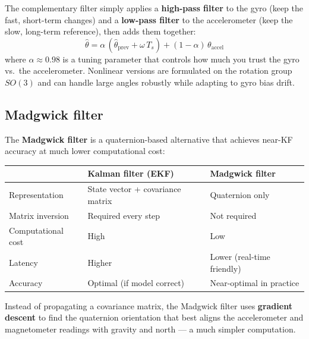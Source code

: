 \documentclass[12pt, a4paper]{article}
\begin{document}
The complementary filter simply applies a \textbf{high-pass filter}
to the gyro (keep the fast, short-term changes) and a
\textbf{low-pass filter} to the accelerometer (keep the slow,
long-term reference), then adds them together:
\[
  \hat{\theta} = \alpha\,(\hat{\theta}_{\text{prev}}
    + \omega\,T_s)
    + (1-\alpha)\,\theta_{\text{accel}}
\]
where $\alpha \approx 0.98$ is a tuning parameter that controls how
much you trust the gyro vs.\ the accelerometer.
Nonlinear versions are formulated on the rotation group $SO(3)$
and can handle large angles robustly while adapting to gyro bias
drift.

\subsection*{Madgwick filter}

The \textbf{Madgwick filter} is a quaternion-based alternative that
achieves near-KF accuracy at much lower computational cost:

\begin{center}
\renewcommand{\arraystretch}{1.5}
\begin{tabular}{p{4cm} p{4.5cm} p{4.5cm}}
  \toprule
  & \textbf{Kalman filter (EKF)} & \textbf{Madgwick filter} \\
  \midrule
  Representation & State vector + covariance matrix & Quaternion only \\
  Matrix inversion & Required every step & Not required \\
  Computational cost & High & Low \\
  Latency & Higher & Lower (real-time friendly) \\
  Accuracy & Optimal (if model correct) & Near-optimal in practice \\
  \bottomrule
\end{tabular}
\end{center}

Instead of propagating a covariance matrix, the Madgwick filter uses
\textbf{gradient descent} to find the quaternion orientation that
best aligns the accelerometer and magnetometer readings with gravity
and north --- a much simpler computation.
\end{document}
